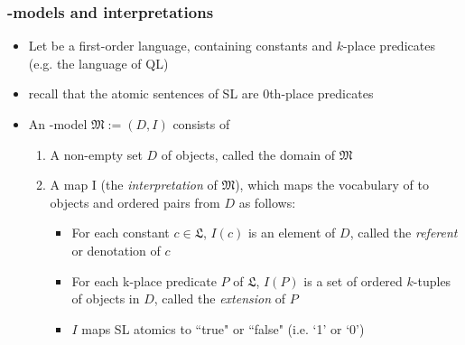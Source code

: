 \begin{frame}
\frametitle{-models and interpretations}

\begin{itemize}%

\item Let  be a first-order language, containing constants and $k$-place predicates (e.g. the language of QL)
\bi
\item recall that the atomic sentences of SL are 0th-place predicates
\ei
\item An -model $\mathfrak{M} := (D, I)$ consists of

\begin{enumerate}

\item A non-empty set $D$ of objects, called the domain of   $\mathfrak{M}$

\item A map I (the \textit{interpretation} of $\mathfrak{M}$), which maps the vocabulary of  to objects and ordered pairs from $D$ as follows:

\begin{itemize}

\small

\item For each constant $c \in \mathfrak{L}$, $I(c)$ is an element of $D$, called the \textit{referent} or denotation of $c$

\item For each k-place predicate $P$ of $\mathfrak{L}$, $I(P)$ is a set of ordered $k$-tuples of objects in $D$, called the \textit{extension} of $P$
\item $I$ maps SL atomics to ``true" or ``false" (i.e. `1' or `0')

\end{itemize}

\end{enumerate}


\end{itemize}
\end{frame}

